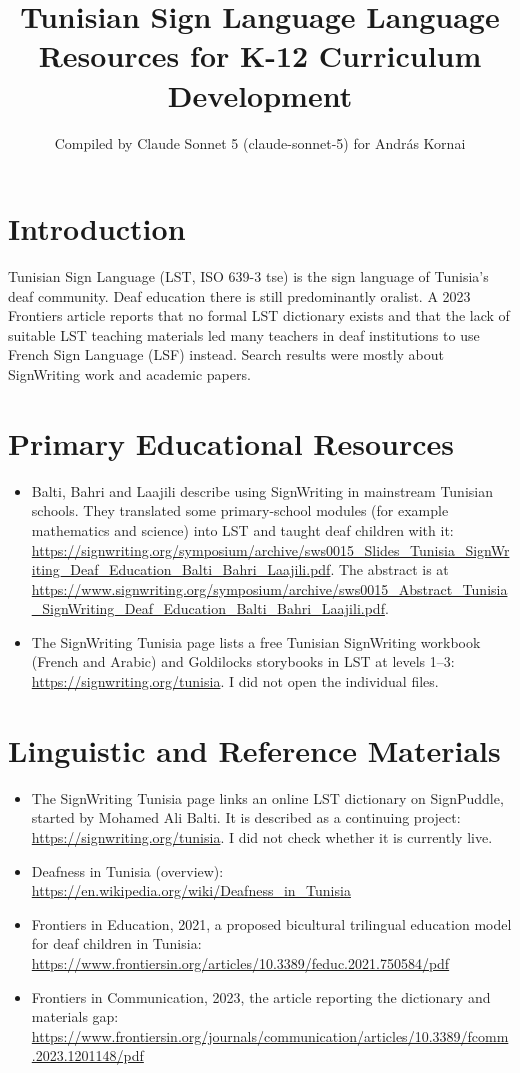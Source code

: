 \documentclass[12pt]{article}
\title{Tunisian Sign Language Language Resources for K-12 Curriculum Development}
\author{Compiled by Claude Sonnet 5 (claude-sonnet-5) for Andr\'as Kornai}
\date{}
\begin{document}
\maketitle

\section{Introduction}
Tunisian Sign Language (LST, ISO 639-3 tse) is the sign language of Tunisia's deaf community. Deaf education there is still predominantly oralist. A 2023 Frontiers article reports that no formal LST dictionary exists and that the lack of suitable LST teaching materials led many teachers in deaf institutions to use French Sign Language (LSF) instead. Search results were mostly about SignWriting work and academic papers.

\section{Primary Educational Resources}
\begin{itemize}
\item Balti, Bahri and Laajili describe using SignWriting in mainstream Tunisian schools. They translated some primary-school modules (for example mathematics and science) into LST and taught deaf children with it: \url{https://signwriting.org/symposium/archive/sws0015_Slides_Tunisia_SignWriting_Deaf_Education_Balti_Bahri_Laajili.pdf}. The abstract is at \url{https://www.signwriting.org/symposium/archive/sws0015_Abstract_Tunisia_SignWriting_Deaf_Education_Balti_Bahri_Laajili.pdf}.
\item The SignWriting Tunisia page lists a free Tunisian SignWriting workbook (French and Arabic) and Goldilocks storybooks in LST at levels 1--3: \url{https://signwriting.org/tunisia}. I did not open the individual files.
\end{itemize}

\section{Linguistic and Reference Materials}
\begin{itemize}
\item The SignWriting Tunisia page links an online LST dictionary on SignPuddle, started by Mohamed Ali Balti. It is described as a continuing project: \url{https://signwriting.org/tunisia}. I did not check whether it is currently live.
\item Deafness in Tunisia (overview): \url{https://en.wikipedia.org/wiki/Deafness_in_Tunisia}
\item Frontiers in Education, 2021, a proposed bicultural trilingual education model for deaf children in Tunisia: \url{https://www.frontiersin.org/articles/10.3389/feduc.2021.750584/pdf}
\item Frontiers in Communication, 2023, the article reporting the dictionary and materials gap: \url{https://www.frontiersin.org/journals/communication/articles/10.3389/fcomm.2023.1201148/pdf}
\end{itemize}
\end{document}

